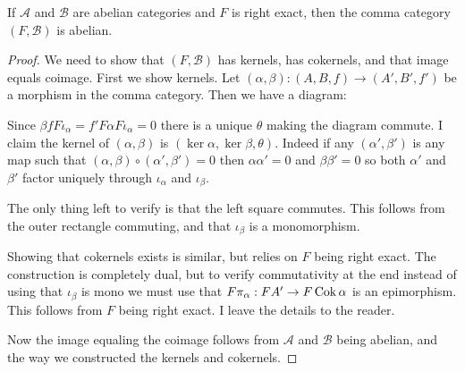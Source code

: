 \begin{prop}
	If $\mathcal A$ and $\mathcal B$ are abelian categories and $F$ is right exact, then the comma category $(F, \mathcal  B)$ is abelian.
	\begin{proof}
		We need to show that $(F, \mathcal B)$ has kernels, has cokernels, and that image equals coimage. First we show kernels. Let $(\alpha, \beta):(A, B, f) \to (A', B', f')$ be a morphism in the comma category. Then we have a diagram:
		\begin{center}
		\end{center}
		Since $\beta f F\iota_\alpha = f' F\alpha F \iota_\alpha = 0$ there is a unique $\theta$ making the diagram commute. I claim the kernel of $(\alpha, \beta)$ is $(\ker \alpha, \ker \beta, \theta)$. Indeed if any $(\alpha', \beta')$ is any map such that $(\alpha, \beta) \circ (\alpha', \beta') = 0$ then $\alpha\alpha'=0$ and $\beta\beta'=0$ so both $\alpha'$ and $\beta'$ factor uniquely through $\iota_\alpha$ and $\iota_\beta$.
		\begin{center}
		\end{center}
		The only thing left to verify is that the left square commutes. This follows from the outer rectangle commuting, and that $\iota_\beta$ is a monomorphism.
		
		Showing that cokernels exists is similar, but relies on $F$ being right exact. The construction is completely dual, but to verify commutativity at the end instead of using that $\iota_\beta$ is mono we must use that $F\pi_\alpha: FA' \to F\operatorname{Cok} \alpha$ is an epimorphism. This follows from $F$ being right exact. I leave the details to the reader. 
		
		Now the image equaling the coimage follows from $\mathcal A$ and $\mathcal B$ being abelian, and the way we constructed the kernels and cokernels.
	\end{proof}
\end{prop}

